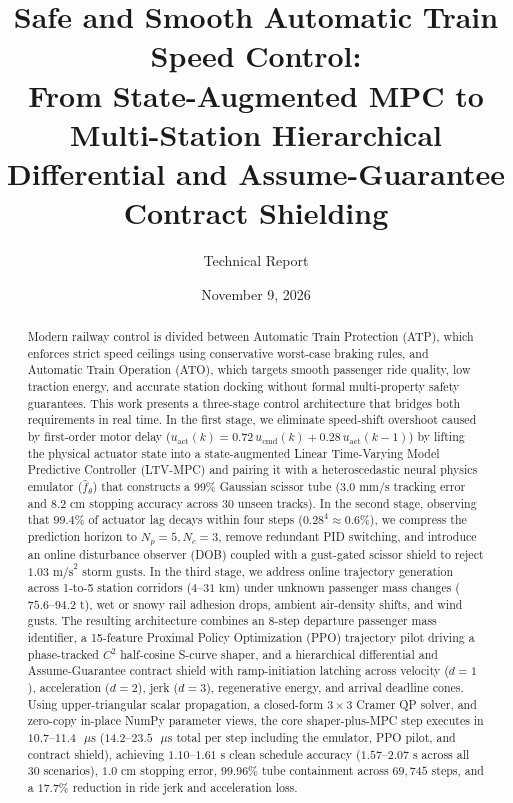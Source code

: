 \documentclass[10pt,a4paper]{article}
\title{Safe and Smooth Automatic Train Speed Control:\\
From State-Augmented MPC to Multi-Station Hierarchical\\
Differential and Assume-Guarantee Contract Shielding}
\author{Technical Report}
\date{November 9, 2026}
\begin{document}
\maketitle

\begin{abstract}
Modern railway control is divided between Automatic Train Protection (ATP), which enforces strict speed ceilings using conservative worst-case braking rules, and Automatic Train Operation (ATO), which targets smooth passenger ride quality, low traction energy, and accurate station docking without formal multi-property safety guarantees. This work presents a three-stage control architecture that bridges both requirements in real time. In the first stage, we eliminate speed-shift overshoot caused by first-order motor delay ($u_{\text{act}}(k) = 0.72\,u_{\text{cmd}}(k) + 0.28\,u_{\text{act}}(k-1)$) by lifting the physical actuator state into a state-augmented Linear Time-Varying Model Predictive Controller (LTV-MPC) and pairing it with a heteroscedastic neural physics emulator ($\hat{f}_\theta$) that constructs a 99\% Gaussian scissor tube ($3.0\text{ mm/s}$ tracking error and $8.2\text{ cm}$ stopping accuracy across 30 unseen tracks). In the second stage, observing that $99.4\%$ of actuator lag decays within four steps ($0.28^4 \approx 0.6\%$), we compress the prediction horizon to $N_p = 5, N_c = 3$, remove redundant PID switching, and introduce an online disturbance observer (DOB) coupled with a gust-gated scissor shield to reject $1.03\text{ m/s}^2$ storm gusts. In the third stage, we address online trajectory generation across 1-to-5 station corridors ($4\text{--}31\text{ km}$) under unknown passenger mass changes ($75.6\text{--}94.2\text{ t}$), wet or snowy rail adhesion drops, ambient air-density shifts, and wind gusts. The resulting architecture combines an 8-step departure passenger mass identifier, a 15-feature Proximal Policy Optimization (PPO) trajectory pilot driving a phase-tracked $C^2$ half-cosine S-curve shaper, and a hierarchical differential and Assume-Guarantee contract shield with ramp-initiation latching across velocity ($d=1$), acceleration ($d=2$), jerk ($d=3$), regenerative energy, and arrival deadline cones. Using upper-triangular scalar propagation, a closed-form $3\times 3$ Cramer QP solver, and zero-copy in-place NumPy parameter views, the core shaper-plus-MPC step executes in $10.7\text{--}11.4\text{ }\mu\text{s}$ ($14.2\text{--}23.5\text{ }\mu\text{s}$ total per step including the emulator, PPO pilot, and contract shield), achieving $1.10\text{--}1.61\text{ s}$ clean schedule accuracy ($1.57\text{--}2.07\text{ s}$ across all 30 scenarios), $1.0\text{ cm}$ stopping error, $99.96\%$ tube containment across $69,745$ steps, and a $17.7\%$ reduction in ride jerk and acceleration loss.
\end{abstract}
\end{document}

